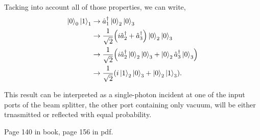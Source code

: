 \documentclass[a4paper]{tufte-handout} %
\newcommand{\hatad}{\hat{a}^\dagger}
\begin{document}
Tacking into account all of those properties, we can write,
\begin{align*}
    \ket{0}_0\ket{1}_1 &\rightarrow\hatad_1\ket{0}_2\ket{0}_3 \\
                       &\rightarrow\frac{1}{\sqrt{2}}\qty(i\hatad_2+\hatad_3)\ket{0}_2\ket{0}_3 \\
                       &\rightarrow\frac{1}{\sqrt{2}}\qty(i\hatad_2\ket{0}_2\ket{0}_3+\ket{0}_2\hatad_3\ket{0}_3) \\
                       &\rightarrow\frac{1}{\sqrt{2}}\qty(i\ket{1}_2\ket{0}_3+\ket{0}_2\ket{1}_3).
\end{align*}

This result can be interpreted as a single-photon incident at one of the input ports of the beam splitter, the other port containing only vacuum, will be either trnasmitted or reflected with equal probability.


Page 140 in book, page 156 in pdf.
\end{document}
